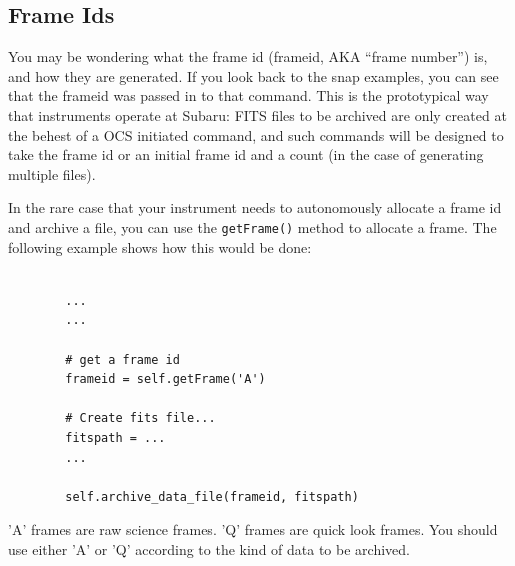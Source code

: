 \documentclass[11pt]{report}
\begin{document}
\subsection{Frame Ids}
You may be wondering what the frame id (frameid, AKA ``frame number'') is,
and how they are generated. If you look back to the snap examples, you
can see that the frameid was passed in to that command. This is the
prototypical way that instruments operate at Subaru: FITS files to be
archived are only created at the behest of a OCS initiated command, and
such commands will be designed to take the frame id or an initial frame
id and a count (in the case of generating multiple files). 

In the rare case that your instrument needs to autonomously allocate a
frame id and archive a file, you can use the {\tt getFrame()} method to
allocate a frame. The following example shows how this would be done: 
\begin{verbatim}

        ...
        ...

        # get a frame id
        frameid = self.getFrame('A')

        # Create fits file...
        fitspath = ...
        ...

        self.archive_data_file(frameid, fitspath)

\end{verbatim}
'A' frames are raw science frames. 'Q' frames are quick look frames.
You should use either 'A' or 'Q' according to the kind of data
to be archived. 
\end{document}
